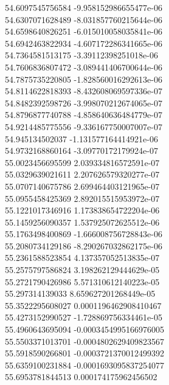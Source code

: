 {54.6097545756584 -9.958152986655477e-06 \\
54.6307071628489 -8.031857760215644e-06 \\
54.6598640826251 -6.015010058035841e-06 \\
54.6942463822934 -4.607172286341665e-06 \\
54.7364581513175 -3.39112398251018e-06 \\
54.7606836807472 -3.089441406700644e-06 \\
54.7875735220805 -1.828560016292613e-06 \\
54.8114622818393 -8.432608069597336e-07 \\
54.8482392598726 -3.998070212674065e-07 \\
54.8796877740788 -4.858640636484779e-07 \\
54.9214485775556 -9.336167750007007e-07 \\
54.945134502037 -1.131577164414921e-06 \\
54.9732168860164 -3.09770172179924e-07 \\
55.0023456695599 2.039334816572591e-07 \\
55.0329639021611 2.207626579320277e-07 \\
55.0707140675786 2.699464403121965e-07 \\
55.0955458425369 2.892015515953972e-07 \\
55.1221017346916 1.173838654722204e-06 \\
55.1459256090357 1.537925072625512e-06 \\
55.1763498400869 -1.666008756728843e-06 \\
55.2080734129186 -8.290267032862175e-06 \\
55.2361588523854 4.137357052513835e-07 \\
55.2575797586824 3.198262129444629e-05 \\
55.2721790426986 5.571310612140223e-05 \\
55.297314139033 8.659627201268449e-05 \\
55.3522295608027 0.0001196462908410467 \\
55.4273152990527 -1.728869756334461e-05 \\
55.4960643695094 -0.0003454995166976005 \\
55.5503371013701 -0.0004802629409823567 \\
55.5918590266801 -0.0003721370012499392 \\
55.6359100231884 -0.0001693095837254077 \\
55.6953781844513 0.000174175962456502 \\
}
